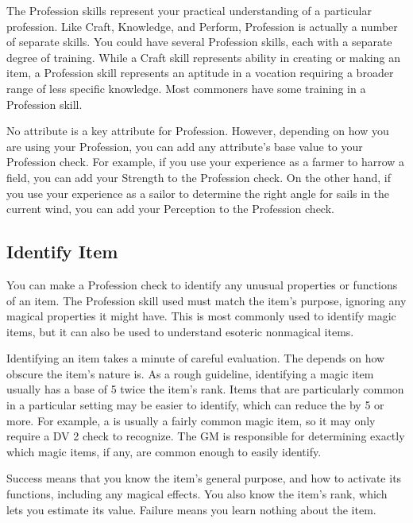\newpage
{}
    The Profession skills represent your practical understanding of a particular profession.
        Like Craft, Knowledge, and Perform, Profession is actually a number of separate skills.
        You could have several Profession skills, each with a separate degree of training.
        While a Craft skill represents ability in creating or making an item, a Profession skill represents an aptitude in a vocation requiring a broader range of less specific knowledge.
        Most commoners have some training in a Profession skill.

        No attribute is a key attribute for Profession.
        However, depending on how you are using your Profession, you can add any attribute's base value to your Profession check.
        For example, if you use your experience as a farmer to harrow a field, you can add your Strength to the Profession check.
        On the other hand, if you use your experience as a sailor to determine the right angle for sails in the current wind, you can add your Perception to the Profession check.

    \subsection{Identify Item}
        You can make a Profession check to identify any unusual properties or functions of an item.
        The Profession skill used must match the item's purpose, ignoring any magical properties it might have.
        This is most commonly used to identify magic items, but it can also be used to understand esoteric nonmagical items.

        Identifying an item takes a minute of careful evaluation.
        The  depends on how obscure the item's nature is.
        As a rough guideline, identifying a magic item usually has a base  of 5 \add twice the item's rank.
        Items that are particularly common in a particular setting may be easier to identify, which can reduce the  by 5 or more.
        For example, a  is usually a fairly common magic item, so it may only require a DV 2 check to recognize.
        The GM is responsible for determining exactly which magic items, if any, are common enough to easily identify.

        Success means that you know the item's general purpose, and how to activate its functions, including any magical effects.
        You also know the item's rank, which lets you estimate its value.
        Failure means you learn nothing about the item.

